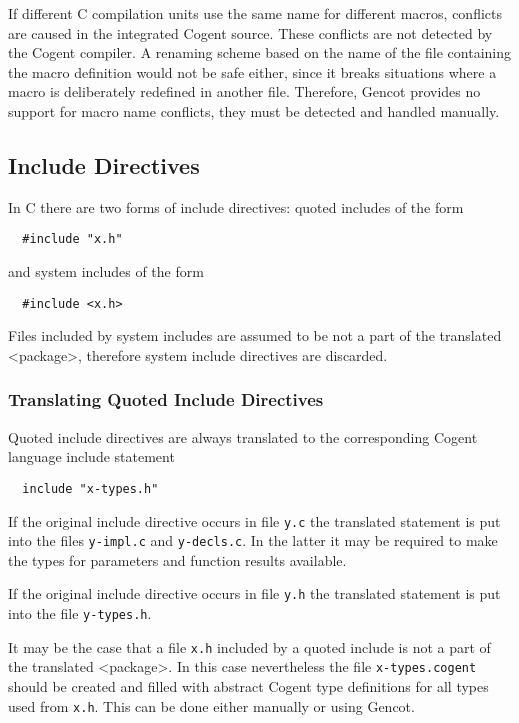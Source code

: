 \documentclass[a4paper]{report}
\newcommand{\code}[1]{\textnormal{\texttt{#1}}}
\begin{document}
If different C compilation units use the same name for different macros, conflicts are caused in the integrated Cogent
source. These conflicts are not detected by the Cogent compiler. A renaming scheme based on the name of the file 
containing the macro definition would not be safe either, since it breaks situations where a macro is deliberately
redefined in another file. Therefore, Gencot provides no support for macro name conflicts, they must be detected and
handled manually.

\subsection{Include Directives}

In C there are two forms of include directives: quoted includes of the form
\begin{verbatim}
  #include "x.h"
\end{verbatim}
and system includes of the form
\begin{verbatim}
  #include <x.h>
\end{verbatim}
Files included by system includes are assumed to be not a part of the translated <package>, therefore system
include directives are discarded.

\subsubsection{Translating Quoted Include Directives}

Quoted include directives are always translated to the corresponding Cogent language include statement
\begin{verbatim}
  include "x-types.h"
\end{verbatim}
If the original include directive occurs in file \code{y.c} the translated statement is put into the files 
\code{y-impl.c} and \code{y-decls.c}. In the latter it may be required to make the types for parameters and
function results available.

If the original include directive occurs in file \code{y.h} the translated statement is put into the file
\code{y-types.h}. 

It may be the case that a file \code{x.h} included by a quoted include is not a part of the translated <package>. 
In this case nevertheless the file \code{x-types.cogent} should be created and filled with abstract Cogent type
definitions for all types used from \code{x.h}. This can be done either manually or using Gencot.
\end{document}
